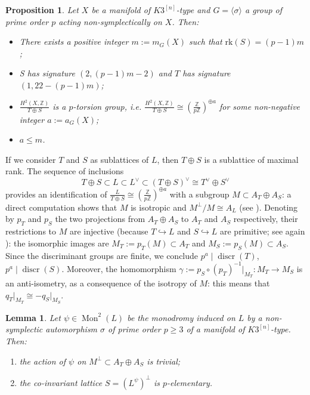 \documentclass{amsart}
\newtheorem{prop}[theorem]{Proposition}
\newtheorem{lemma}[theorem]{Lemma}
\theoremstyle{definition}
\newcommand{\ra}{\rightarrow}
\newcommand{\IZ}{\mathbb{Z}}
\newcommand{\coloneqq}{:=}
\newcommand{\rk}{\mathrm{rk}}
\newcommand{\hskn}{K3^{\left[n\right]}}
\DeclareMathOperator{\discr}{discr}
\DeclareMathOperator{\Mo}{Mon}
\begin{document}
\begin{prop}\label{preliminaries}
Let $X$ be a manifold of $\hskn$-type and $G = \langle \sigma \rangle$ a group of prime order $p$ acting non-symplectically on $X$. Then:
\begin{itemize}
\item There exists a positive integer $m := m_G(X)$ such that $\rk(S) = (p-1)m$;
\item S has signature $(2, (p-1)m -2)$ and $T$ has signature $(1, 22 - (p-1)m)$;
\item $\frac{H^2(X,\IZ)}{T \oplus S}$ is a $p$-torsion group, i.e. $\frac{H^2(X,\IZ)}{T \oplus S} \cong \left(\frac{\IZ}{p \IZ} \right)^{\oplus a}$ for some non-negative integer $a := a_G(X)$;
\item $a \leq m$.
\end{itemize}
\end{prop} 

If we consider $T$ and $S$ as sublattices of $L$, then $T \oplus S$ is a  sublattice of maximal rank. The sequence of inclusions
\[ T \oplus S \subset L \subset L^\vee \subset (T \oplus S)^\vee \cong T^\vee \oplus S^\vee \]
\noindent provides an identification of $\frac{L}{T \oplus S} \cong \left(\frac{\IZ}{p \IZ} \right)^{\oplus a}$ with a subgroup $M \subset A_T \oplus A_S$: a direct computation shows that $M$ is isotropic and $M^\perp / M \cong A_L$ (see \cite[\S 5]{nikulin}). Denoting by $p_T$ and $p_S$ the two projections from $A_T \oplus A_S$ to $A_T$ and $A_S$ respectively, their restrictions to $M$ are injective (because $T \hookrightarrow L$ and $S \hookrightarrow L$ are primitive; see again \cite[\S 5]{nikulin}): the isomorphic images are $M_T \coloneqq p_T(M) \subset A_T$ and $M_S \coloneqq p_S(M) \subset A_S$. Since the discriminant groups are finite, we conclude $p^a \mid \discr(T)$, $p^a \mid \discr(S)$. Moreover, the homomorphism $\gamma := p_S \circ (p_T)^{-1}\rvert_{M_T}: M_T \ra M_S$ is an anti-isometry, as a consequence of the isotropy of $M$: this means that $q_T\rvert_{M_T} \cong - q_S\rvert_{M_S}$.

\begin{lemma}\label{S p-elem}
Let $\psi \in \Mo^2(L)$ be the monodromy induced on $L$ by a non-symplectic automorphism $\sigma$ of prime order $p \geq 3$ of a manifold of $\hskn$-type. Then: 
\begin{enumerate}
\item[\textit{(i)}] the action of $\psi$ on $M^\perp \subset A_T \oplus A_S$ is trivial;
\item[\textit{(ii)}] the co-invariant lattice $S = \left( L^\psi \right)^\perp$ is $p$-elementary.
\end{enumerate}
\end{lemma}
\end{document}
